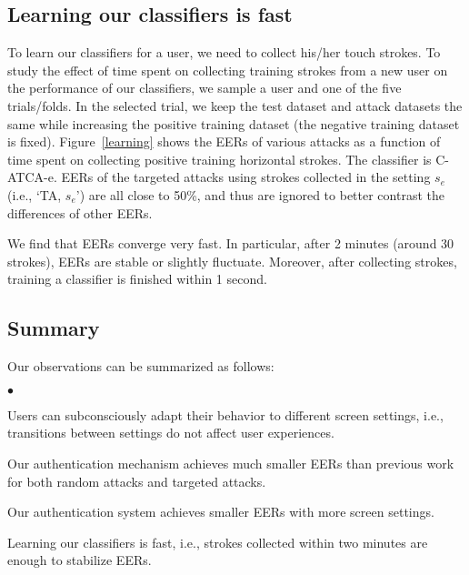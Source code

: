 \documentclass{sig-alternate-05-2015}
\newenvironment{packeditemize}{\begin{list}{$\bullet$}{\setlength{\itemsep}{2pt}\addtolength{\labelwidth}{4pt}\setlength{\leftmargin}{20pt}\setlength{\listparindent}{\parindent}\setlength{\parsep}{0pt}\setlength{\topsep}{0pt}}}{\end{list}}
\begin{document}
 
\subsection{Learning our classifiers is fast}
To learn our classifiers for a user, we
need to collect his/her touch strokes. To study the effect of time spent on
collecting training strokes from a new user on the performance of our classifiers, 
we sample a
user and one of the five trials/folds. In the selected trial, we keep the test dataset
and attack datasets the same while increasing the positive training dataset 
(the negative training dataset is fixed).
Figure~\ref{learning} shows the EERs of various attacks as a function of time
spent on collecting positive training horizontal strokes. The classifier is C-ATCA-e. EERs
of the targeted attacks using strokes collected in the setting $s_e$ (i.e., `TA,
$s_e$') are all close to 50\%, and thus are ignored to better contrast the
differences of other EERs. 

We find that EERs converge very fast. In particular, after 2 minutes (around 30
strokes),  EERs are stable or slightly fluctuate. Moreover, after collecting
 strokes, training a classifier is finished within 1
second.





 


  



\subsection{Summary}
Our observations can be summarized as follows:
\begin{packeditemize}
\item Users can subconsciously adapt their behavior to different screen settings, 
i.e., transitions between settings do  not affect user experiences.
\item Our authentication mechanism achieves 
much smaller EERs than previous work for both random attacks and targeted attacks.  
\item Our authentication system achieves smaller EERs with more screen settings.  
\item Learning our classifiers is fast, i.e., strokes collected within two minutes are enough to stabilize  EERs.
\end{packeditemize}
\end{document}
